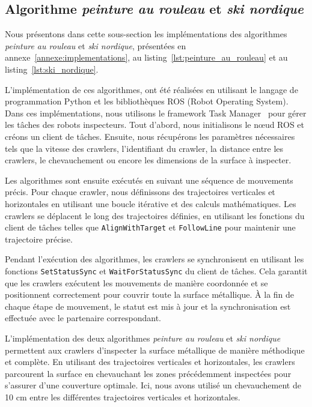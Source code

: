 \documentclass[francais,RandD]{rapportPFE}
\begin{document}
		\subsection*{Algorithme \textit{peinture au rouleau} et \textit{ski nordique}}
			Nous présentons dans cette sous-section les implémentations des algorithmes \textit{peinture au rouleau} et \textit{ski nordique}, présentées en annexe~\ref{annexe:implementations}, au listing~\ref{lst:peinture_au_rouleau} et au listing~\ref{lst:ski_nordique}.

			L'implémentation de ces algorithmes, ont été réalisées en utilisant le langage de programmation Python et les bibliothèques ROS (Robot Operating System).
			Dans ces implémentations, nous utilisons le framework Task Manager~\cite{ROSTaskManager} pour gérer les tâches des robots inspecteurs.
			Tout d'abord, nous initialisons le nœud ROS et créons un client de tâches.
			Ensuite, nous récupérons les paramètres nécessaires tels que la vitesse des crawlers, l'identifiant du crawler, la distance entre les crawlers, le chevauchement ou encore les dimensions de la surface à inspecter.

			Les algorithmes sont ensuite exécutés en suivant une séquence de mouvements précis.
			Pour chaque crawler, nous définissons des trajectoires verticales et horizontales en utilisant une boucle itérative et des calculs mathématiques. Les crawlers se déplacent le long des trajectoires définies, en utilisant les fonctions du client de tâches telles que \texttt{AlignWithTarget} et \texttt{FollowLine} pour maintenir une trajectoire précise.

			Pendant l'exécution des algorithmes, les crawlers se synchronisent en utilisant les fonctions \texttt{SetStatusSync} et \texttt{WaitForStatusSync} du client de tâches.
			Cela garantit que les crawlers exécutent les mouvements de manière coordonnée et se positionnent correctement pour couvrir toute la surface métallique.
			À la fin de chaque étape de mouvement, le statut est mis à jour et la synchronisation est effectuée avec le partenaire correspondant.

			L'implémentation des deux algorithmes \textit{peinture au rouleau} et \textit{ski nordique} permettent aux crawlers d'inspecter la surface métallique de manière méthodique et complète.
			En utilisant des trajectoires verticales et horizontales, les crawlers parcourent la surface en chevauchant les zones précédemment inspectées pour s'assurer d'une couverture optimale.
			Ici, nous avons utilisé un chevauchement de 10 cm entre les différentes trajectoires verticales et horizontales.
\end{document}
